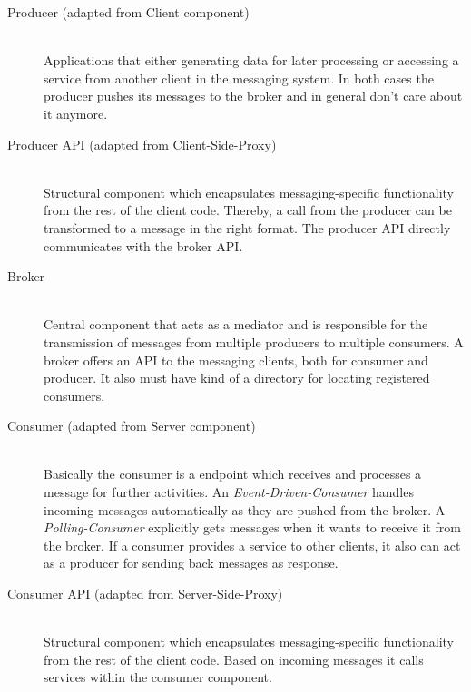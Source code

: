 \begin{description}
    \item[Producer (adapted from Client component)] \hfill \\
        {Applications that either generating data for later processing or
        accessing a service from another client in the messaging system. In both
        cases the producer pushes its messages to the broker and in general don't care 
        about it anymore.}
    \item[Producer API (adapted from Client-Side-Proxy)] \hfill \\
        {Structural component which encapsulates messaging-specific
        functionality from the rest of the client code. Thereby, a call from the producer
        can be transformed to a message in the right format. The producer API
        directly communicates with the broker API.}
    \item[Broker] \hfill \\
        {Central component that acts as a mediator and is responsible for the
        transmission of messages from multiple producers to multiple consumers.
        A broker offers an API to the messaging clients, both for consumer and
        producer. It also must have kind of a directory for locating registered
        consumers.} 
    \item[Consumer (adapted from Server component)] \hfill \\
        {Basically the consumer is a endpoint which receives and processes a
            message for further activities. An \textit{Event-Driven-Consumer}
            handles incoming messages automatically as they are pushed from the
            broker. A \textit{Polling-Consumer} explicitly gets messages when it
            wants to receive it from the broker. If a consumer provides a
            service to other clients, it also can act as a producer for sending
            back messages as response.}
\item[Consumer API (adapted from Server-Side-Proxy)] \hfill \\
        {Structural component which encapsulates messaging-specific
        functionality from the rest of the client code. Based on incoming
        messages it calls services within the consumer component. }
\end{description}

